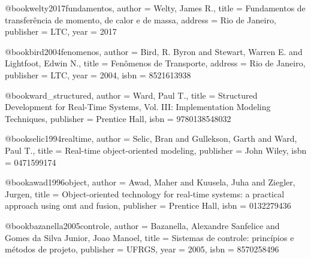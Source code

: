 @book{welty2017fundamentos,
  author = {Welty, James R.},
  title = {Fundamentos de transferência de momento, de calor e de massa},
  address = {Rio de Janeiro},
  publisher = {LTC},
  year = {2017}
}

@book{bird2004fenomenos,
  author = {Bird, R. Byron and Stewart, Warren E. and Lightfoot, Edwin N.},
  title = {Fenômenos de Transporte},
  address = {Rio de Janeiro},
  publisher = {LTC},
  year = {2004},
  isbn = {8521613938}
}

%

@book{ward_structured,
  author = {Ward, Paul T.},
  title = {Structured Development for Real-Time Systems, Vol. III: Implementation Modeling Techniques},
  publisher = {Prentice Hall},
  isbn = {9780138548032}
}

@book{selic1994realtime,
  author = {Selic, Bran and Gullekson, Garth and Ward, Paul T.},
  title = {Real-time object-oriented modeling},
  publisher = {John Wiley},
  isbn = {0471599174}
}

@book{awad1996object,
  author = {Awad, Maher and Kuusela, Juha and Ziegler, Jurgen},
  title = {Object-oriented technology for real-time systems: a practical approach using omt and fusion},
  publisher = {Prentice Hall},
  isbn = {0132279436}
}

%

@book{bazanella2005controle,
  author = {Bazanella, Alexandre Sanfelice and Gomes da Silva Junior, Joao Manoel},
  title = {Sistemas de controle: princípios e métodos de projeto},
  publisher = {UFRGS},
  year = {2005},
  isbn = {8570258496}
}

